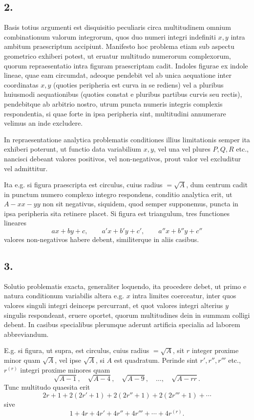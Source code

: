 \documentclass[12pt]{article}
\begin{document}
\subsection*{2.}

Basis totius argumenti est disquisitio peculiaris circa multitudinem omnium combinationum valorum integrorum, quos duo numeri integri indefiniti $x,y$ intra ambitum praescriptum accipiunt. Manifesto hoc problema etiam sub aspectu geometrico exhiberi potest, ut eruatur multitudo numerorum complexorum, quorum repraesentatio intra figuram praescriptam cadit. Indoles figurae ex indole lineae, quae eam circumdat, adeoque pendebit vel ab unica aequatione inter coordinatas $x,y$ (quoties peripheria est curva in se rediens) vel a pluribus huiusmodi aequationibus (quoties constat e pluribus partibus curvis seu rectis), pendebitque ab arbitrio nostro, utrum puncta numeris integris complexis respondentia, si quae forte in ipsa peripheria sint, multitudini annumerare velimus an inde excludere.

In repraesentatione analytica problematis conditiones illius limitationis semper ita exhiberi poterunt, ut functio data variabilium $x,y$, vel una vel plures $P,Q,R$ etc., nancisci debeant valores positivos, vel non-negativos, prout valor vel excluditur vel admittitur.

Ita e.g. si figura praescripta est circulus, cuius radius $=\sqrt A$, dum centrum cadit in punctum numero complexo integro respondens, conditio analytica erit, ut $A-xx-yy$ non sit negativus, siquidem, quod semper supponemus, puncta in ipsa peripheria sita retinere placet. Si figura est triangulum, tres functiones lineares
\[
ax+by+c,\qquad a'x+b'y+c',\qquad a''x+b''y+c''
\]
valores non-negativos habere debent, similiterque in aliis casibus.

\subsection*{3.}

Solutio problematis exacta, generaliter loquendo, ita procedere debet, ut primo e natura conditionum variabilis altera e.g. $x$ intra limites coerceatur, inter quos valores singuli integri deinceps percurrant, et quot valores integri alterius $y$ singulis respondeant, eruere oportet, quorum multitudines dein in summam colligi debent. In casibus specialibus plerumque aderunt artificia specialia ad laborem abbreviandum.

E.g. si figura, ut supra, est circulus, cuius radius $=\sqrt A$, sit $r$ integer proxime minor quam $\sqrt A$, vel ipse $\sqrt A$, si $A$ est quadratum. Perinde sint $r',r'',r'''$ etc., $r^{(r)}$ integri proxime minores quam
\[
\sqrt{A-1},\quad \sqrt{A-4},\quad \sqrt{A-9},\quad \ldots,\quad \sqrt{A-rr}.
\]
Tunc multitudo quaesita erit
\[
2r+1+2(2r'+1)+2(2r''+1)+2(2r'''+1)+\cdots
\]
sive
\[
1+4r+4r'+4r''+4r'''+\cdots+4r^{(r)}.
\]
\end{document}
